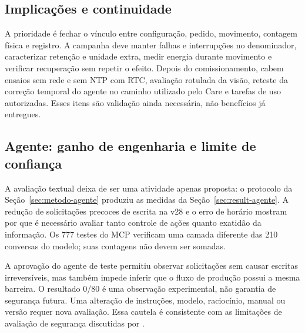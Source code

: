 \subsection{Implicações e continuidade}
A prioridade é fechar o vínculo entre configuração, pedido, movimento, contagem física e registro. A campanha deve manter falhas e interrupções no denominador, caracterizar retenção e unidade extra, medir energia durante movimento e verificar recuperação sem repetir o efeito. Depois do comissionamento, cabem ensaios sem rede e sem NTP com RTC, avaliação rotulada da visão, reteste da correção temporal do agente no caminho utilizado pelo Care e tarefas de uso autorizadas. Esses itens são validação ainda necessária, não benefícios já entregues.

\subsection{Agente: ganho de engenharia e limite de confiança}
A avaliação textual deixa de ser uma atividade apenas proposta: o protocolo da Seção~\ref{sec:metodo-agente} produziu as medidas da Seção~\ref{sec:result-agente}. A redução de solicitações precoces de escrita na v28 e o erro de horário mostram por que é necessário avaliar tanto controle de ações quanto exatidão da informação. Os 777 testes do MCP verificam uma camada diferente das 210 conversas do modelo; suas contagens não devem ser somadas.

A aprovação do agente de teste permitiu observar solicitações sem causar escritas irreversíveis, mas também impede inferir que o fluxo de produção possui a mesma barreira. O resultado 0/80 é uma observação experimental, não garantia de segurança futura. Uma alteração de instruções, modelo, raciocínio, manual ou versão requer nova avaliação. Essa cautela é consistente com as limitações de avaliação de segurança discutidas por .

